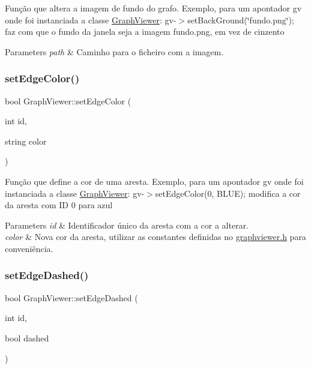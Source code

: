 Função que altera a imagem de fundo do grafo. Exemplo, para um apontador gv onde foi instanciada a classe \mbox{\hyperlink{class_graph_viewer}{Graph\+Viewer}}\+: gv-\/$>$set\+Back\+Ground(\char`\"{}fundo.\+png\char`\"{}); faz com que o fundo da janela seja a imagem fundo.\+png, em vez de cinzento


\begin{DoxyParams}{Parameters}
{\em path} & Caminho para o ficheiro com a imagem. \\
\hline
\end{DoxyParams}
\mbox{\label{class_graph_viewer_a07ccc96707efae4aa5f3ced3dca015af}} 
\subsubsection{\texorpdfstring{set\+Edge\+Color()}{setEdgeColor()}}
{\footnotesize\ttfamily bool Graph\+Viewer\+::set\+Edge\+Color (\begin{DoxyParamCaption}\item[{int}]{id,  }\item[{string}]{color }\end{DoxyParamCaption})}

Função que define a cor de uma aresta. Exemplo, para um apontador gv onde foi instanciada a classe \mbox{\hyperlink{class_graph_viewer}{Graph\+Viewer}}\+: gv-\/$>$set\+Edge\+Color(0, B\+L\+U\+E); modifica a cor da aresta com ID 0 para azul


\begin{DoxyParams}{Parameters}
{\em id} & Identificador único da aresta com a cor a alterar. \\
\hline
{\em color} & Nova cor da aresta, utilizar as constantes definidas no \mbox{\hyperlink{graphviewer_8h}{graphviewer.\+h}} para conveniência. \\
\hline
\end{DoxyParams}
\mbox{\label{class_graph_viewer_a1698f1c6b3a8e7cabc7b7d7cf42fc7f0}} 
\subsubsection{\texorpdfstring{set\+Edge\+Dashed()}{setEdgeDashed()}}
{\footnotesize\ttfamily bool Graph\+Viewer\+::set\+Edge\+Dashed (\begin{DoxyParamCaption}\item[{int}]{id,  }\item[{bool}]{dashed }\end{DoxyParamCaption})}

